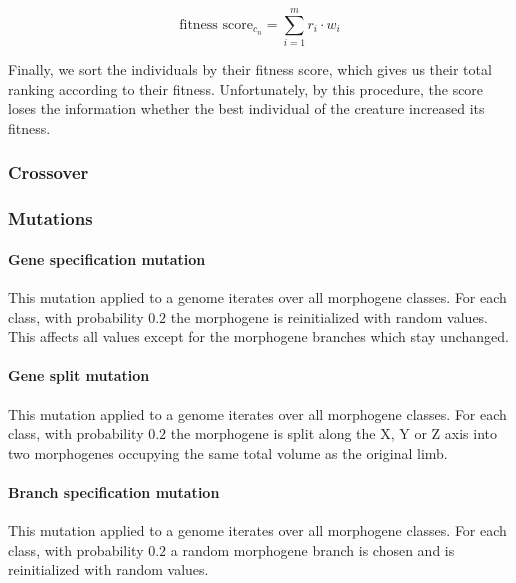 \documentclass[main]{subfiles}
\begin{document}
\[\text{fitness score}_{c_n} = \sum\limits^m_{i=1} r_i \cdot w_i \]

Finally, we sort the individuals by their fitness score, which gives us their total ranking according to their fitness. Unfortunately, by this procedure, the score loses the information whether the best individual of the creature increased its fitness. 


\subsubsection{Crossover}

\lipsum[14]


\subsubsection{Mutations}


\paragraph{Gene specification mutation}

This mutation applied to a genome iterates over all morphogene classes. For each class, with probability $0.2$ the morphogene is reinitialized with random values. This affects all values except for the morphogene branches which stay unchanged.

\paragraph{Gene split mutation}

This mutation applied to a genome iterates over all morphogene classes. For each class, with probability $0.2$ the morphogene is split along the X, Y or Z axis into two morphogenes occupying the same total volume as the original limb.

\paragraph{Branch specification mutation}

This mutation applied to a genome iterates over all morphogene classes. For each class, with probability $0.2$ a random morphogene branch is chosen and is reinitialized with random values. 
\end{document}
